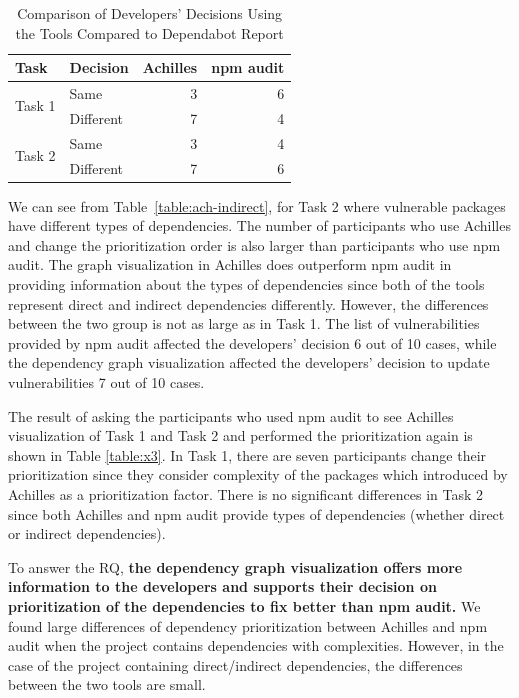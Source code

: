 \documentclass[conference]{IEEEtran}
\begin{document}
	
	\begin{table}[tb]
		\centering
		\caption{Comparison of Developers' Decisions Using the Tools Compared to Dependabot Report}
		\begin{tabular}{llrr}
			\toprule
			Task & Decision & Achilles & npm audit \\
			\midrule
			\multirow{2}{*}{Task 1} & Same & 3 & 6 \\ 
			& Different & 7 & 4 \\ \midrule
			\multirow{2}{*}{Task 2} & Same & 3 & 4 \\ 
			& Different & 7 & 6 \\
			\bottomrule
		\end{tabular}
		\label{table:compare-ach}
	\end{table}
	
	We can see from Table~\ref{table:ach-indirect}, for Task 2 where vulnerable packages have different types of dependencies. The number of participants who use Achilles and change the prioritization order is also larger than participants who use npm audit. The graph visualization in Achilles does outperform npm audit in providing information about the types of dependencies since both of the tools represent direct and indirect dependencies differently. However, the differences between the two group is not as large as in Task 1. The list of vulnerabilities provided by npm audit affected the developers' decision 6 out of 10 cases, while the dependency graph visualization affected the developers' decision to update vulnerabilities 7 out of 10 cases.
	
	The result of asking the participants who used npm audit to see Achilles visualization of Task 1 and Task 2 and performed the prioritization again is shown in Table \ref{table:x3}. In Task 1, there are seven participants change their prioritization since they consider complexity of the packages which introduced by Achilles as a prioritization factor. There is no significant differences in Task 2 since both Achilles and npm audit provide types of dependencies (whether direct or indirect dependencies).
	
	To answer the RQ, \textbf{the dependency graph visualization offers more information to the developers and supports their decision on prioritization of the dependencies to fix better than npm audit.} We found large differences of dependency prioritization between Achilles and npm audit when the project contains dependencies with complexities. However, in the case of the project containing direct/indirect dependencies, the differences between the two tools are small.
	
\end{document}
